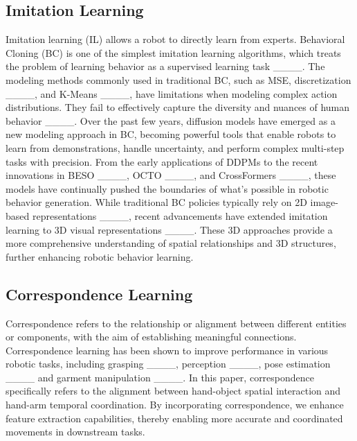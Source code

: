 \subsection{Imitation Learning}
Imitation learning (IL) allows a robot to directly learn from experts. Behavioral Cloning (BC) is one of the simplest imitation learning algorithms, which treats the problem of learning behavior as a supervised learning task ____.
The modeling methods commonly used in traditional BC, such as MSE, discretization ____, and K-Means ____, have limitations when modeling complex action distributions. They fail to effectively capture the diversity and nuances of human behavior ____. 
Over the past few years, diffusion models have emerged as a new modeling approach in BC, becoming powerful tools that enable robots to learn from demonstrations, handle uncertainty, and perform complex multi-step tasks with precision.
From the early applications of DDPMs to the recent innovations in BESO ____, OCTO ____, and CrossFormers ____, these models have continually pushed the boundaries of what's possible in robotic behavior generation.
While traditional BC policies typically rely on 2D image-based representations ____, recent advancements have extended imitation learning to 3D visual representations ____. 
These 3D approaches provide a more comprehensive understanding of spatial relationships and 3D structures, further enhancing robotic behavior learning.


\subsection{Correspondence Learning}
Correspondence refers to the relationship or alignment between different entities or components, with the aim of establishing meaningful connections. Correspondence learning has been shown to improve performance in various robotic tasks, including grasping ____, perception ____, pose estimation ____ and garment manipulation ____. In this paper, correspondence specifically refers to the alignment between hand-object spatial interaction and hand-arm temporal coordination. By incorporating correspondence, we enhance feature extraction capabilities, thereby enabling more accurate and coordinated movements in downstream tasks.

%